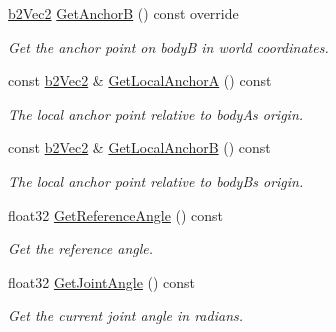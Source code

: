 \begin{DoxyCompactItemize}
\mbox{\label{classb2RevoluteJoint_aa30a5d414b2ff699cc17567ff6e53e6b}} 
\hyperlink{structb2Vec2}{b2\+Vec2} \hyperlink{classb2RevoluteJoint_aa30a5d414b2ff699cc17567ff6e53e6b}{Get\+AnchorB} () const override
\begin{DoxyCompactList}\small\item\em Get the anchor point on bodyB in world coordinates. \end{DoxyCompactList}\item 
\mbox{\label{classb2RevoluteJoint_af8cefd09d50a4e349613722809b8c823}} 
const \hyperlink{structb2Vec2}{b2\+Vec2} \& \hyperlink{classb2RevoluteJoint_af8cefd09d50a4e349613722809b8c823}{Get\+Local\+AnchorA} () const
\begin{DoxyCompactList}\small\item\em The local anchor point relative to bodyA\textquotesingle{}s origin. \end{DoxyCompactList}\item 
\mbox{\label{classb2RevoluteJoint_ac58e115df370181adc1ea1c486d84dc6}} 
const \hyperlink{structb2Vec2}{b2\+Vec2} \& \hyperlink{classb2RevoluteJoint_ac58e115df370181adc1ea1c486d84dc6}{Get\+Local\+AnchorB} () const
\begin{DoxyCompactList}\small\item\em The local anchor point relative to bodyB\textquotesingle{}s origin. \end{DoxyCompactList}\item 
\mbox{\label{classb2RevoluteJoint_ae84b9659fe94f41f54f43d3f64ee0741}} 
float32 \hyperlink{classb2RevoluteJoint_ae84b9659fe94f41f54f43d3f64ee0741}{Get\+Reference\+Angle} () const
\begin{DoxyCompactList}\small\item\em Get the reference angle. \end{DoxyCompactList}\item 
\mbox{\label{classb2RevoluteJoint_a2a83b2276c71bf287771004838f2b507}} 
float32 \hyperlink{classb2RevoluteJoint_a2a83b2276c71bf287771004838f2b507}{Get\+Joint\+Angle} () const
\begin{DoxyCompactList}\small\item\em Get the current joint angle in radians. \end{DoxyCompactList}\item 

\end{DoxyCompactItemize}
